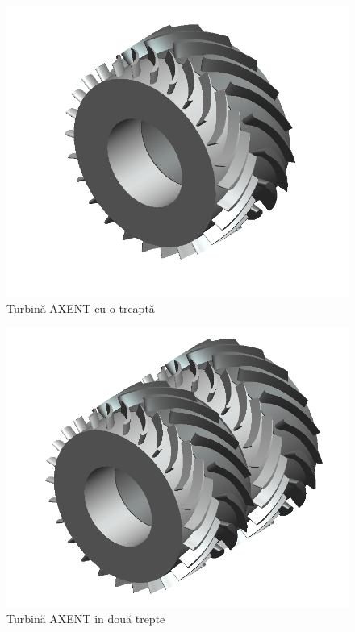 \begin{figure}[h!]
	\centering
	\includegraphics[scale=0.4]{figures/modul_singular.png}
	\caption{Turbină AXENT cu o treaptă \protect\cite{susanhub}}
	\label{Turbină AXENT cu o treaptă}
\end{figure}

\begin{figure}[h!]
	\centering
	\includegraphics[scale=0.4]{figures/modul_in_doua_trepte.png}
	\caption{Turbină AXENT in două trepte \protect\cite{susanhub}}
	\label{Turbină AXENT in două trepte}
\end{figure}



